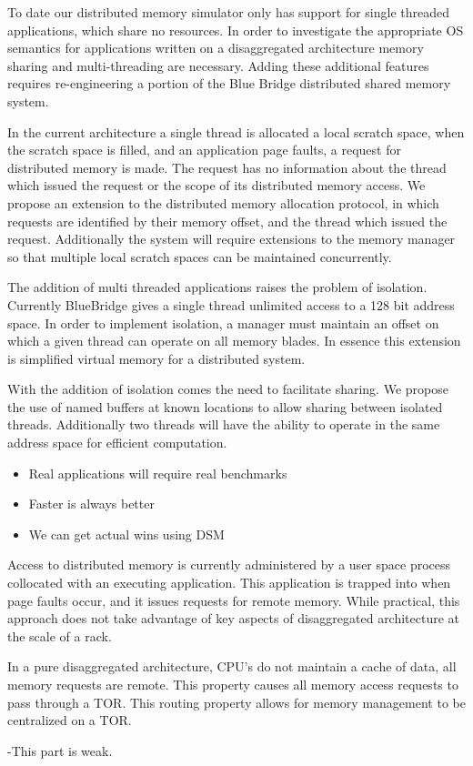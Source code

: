  To date our
distributed memory simulator only has support for single threaded
applications, which share no resources. In order to investigate the
appropriate OS semantics for applications written on a disaggregated
architecture memory sharing and multi-threading are necessary. Adding
these additional features requires re-engineering a portion of the
Blue Bridge distributed shared memory system.

In the current architecture a single thread is allocated a local
scratch space, when the scratch space is filled, and an application
page faults, a request for distributed memory is made. The request has
no information about the thread which issued the request or the scope
of its distributed memory access. We propose an extension to the
distributed memory allocation protocol, in which requests are
identified by their memory offset, and the thread which issued the
request. Additionally the system will require extensions to the memory
manager so that multiple local scratch spaces can be maintained
concurrently.

The addition of multi threaded applications raises the problem of
isolation. Currently BlueBridge gives a single thread unlimited access
to a 128 bit address space. In order to implement isolation, a manager
must maintain an offset on which a given thread can operate on all
memory blades. In essence this extension is simplified virtual memory
for a distributed system.

With the addition of isolation comes the need to facilitate sharing.
We propose the use of named buffers at known locations to allow
sharing between isolated threads. Additionally two threads will have
the ability to operate in the same address space for efficient
computation.

\begin{itemize}
\item Real applications will require real benchmarks
\item Faster is always better
\item We can get actual wins using DSM
\end{itemize}

 Access to distributed memory is currently administered by a
user space process collocated with an executing application. This
application is trapped into when page faults occur, and it issues
requests for remote memory. While practical, this approach does not
take advantage of key aspects of disaggregated architecture at the
scale of a rack.

In a pure disaggregated architecture, CPU’s do not maintain a cache of
data, all memory requests are remote. This property causes all memory
access requests to pass through a TOR. This routing property allows
for memory management to be centralized on a TOR.

-This part is weak.

